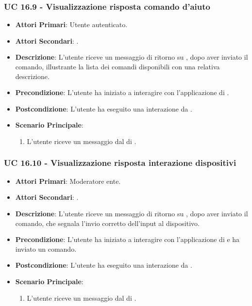 	\subsubsection{UC 16.9 - Visualizzazione risposta comando d'aiuto }

	\begin{itemize}
			\item \textbf{Attori Primari}: Utente autenticato.
			\item \textbf{Attori Secondari}: .
			\item \textbf{Descrizione}: L'utente riceve un messaggio di ritorno su , dopo aver inviato il comando, illustrante la lista dei comandi disponibili con una relativa descrizione.
			\item \textbf{Precondizione}: L'utente ha iniziato a interagire con l'applicazione di .
			\item \textbf{Postcondizione}: L'utente ha eseguito una interazione da .
			\item \textbf{Scenario Principale}:
			\begin{enumerate}
				\item L'utente riceve un messaggio dal  di .
			\end{enumerate}
		\end{itemize}	


	\subsubsection{UC 16.10 - Visualizzazione risposta interazione dispositivi}
		
		\begin{itemize}
			\item \textbf{Attori Primari}: Moderatore ente.
			\item \textbf{Attori Secondari}: .
			\item \textbf{Descrizione}: L'utente riceve un messaggio di ritorno su , dopo aver inviato il comando, che segnala l'invio corretto dell'input al dispositivo. 
			\item \textbf{Precondizione}: L'utente ha iniziato a interagire con l'applicazione di  e ha inviato un comando.
			\item \textbf{Postcondizione}: L'utente ha eseguito una interazione da .
			\item \textbf{Scenario Principale}:
			\begin{enumerate}
				\item L'utente riceve un messaggio dal  di .
			\end{enumerate}
		\end{itemize}	



		




